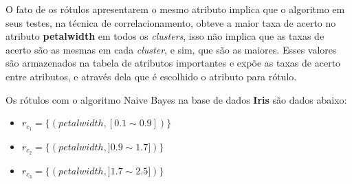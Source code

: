O fato de os rótulos apresentarem o mesmo atributo implica que o algoritmo em seus testes, na técnica de correlacionamento, obteve a maior taxa de acerto no atributo \textbf{petalwidth} em todos os \textit{clusters}, isso não implica que as taxas de acerto são as mesmas em cada \textit{cluster}, e sim, que são as maiores.  Esses valores são armazenados na tabela de atributos importantes e expõe as taxas de acerto entre atributos, e através dela que é escolhido o atributo para rótulo. 
% 


Os rótulos com o algoritmo Naive Bayes na base de dados \textbf{Iris} são dados abaixo:


\begin{itemize}[noitemsep]
 \item ${r_{c_1}=\{ (petalwidth,[ 0.1 \sim 0.9 ] ) \} }$  
 \item ${r_{c_2}=\{ (petalwidth, ] 0.9 \sim 1.7]) \} }$
 \item ${r_{c_3}=\{ (petalwidth, ] 1.7 \sim 2.5 ]) \} }$
\end{itemize}

